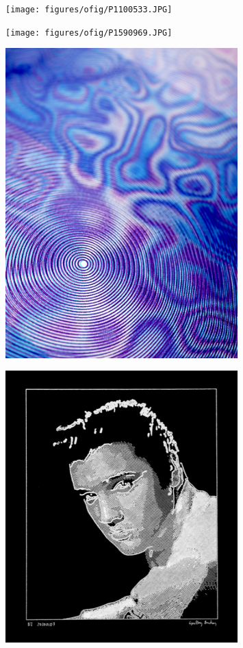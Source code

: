 \documentclass[12pt]{book}
\begin{document}
\begin{figure}
        \centering
        \texttt{[image: figures/ofig/P1100533.JPG]}
    \end{figure}

\begin{figure}
        \centering
        \texttt{[image: figures/ofig/P1590969.JPG]}
    \end{figure}

\begin{figure}
        \centering
        \includegraphics[width=0.8\textwidth]{figures/ofig/P1600032.JPG}
    \end{figure}

\begin{figure}
        \centering
        \includegraphics[width=0.8\textwidth]{figures/ofig/P1770280.JPG}
    \end{figure}
\end{document}
